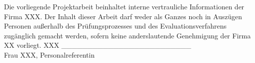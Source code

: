 
	\label{sec:Sperrvermerk}
\vspace{1 cm}
Die vorliegende Projektarbeit beinhaltet interne vertrauliche Informationen der Firma XXX. Der Inhalt dieser Arbeit darf weder als Ganzes noch in Auszügen Personen außerhalb des Prüfungsprozesses und des Evaluationsverfahrens zugänglich gemacht werden, sofern keine anderslautende Genehmigung der Firma XX vorliegt.\vspace{4 cm}\newline
XXX\vspace{2 cm}\newline
\_\_\_\_\_\_\_\_\_\_\_\_\_\_\_\_\_\_\_\_\_\_\_\_\_\\
Frau XXX,\newline
Personalreferentin

\vfill